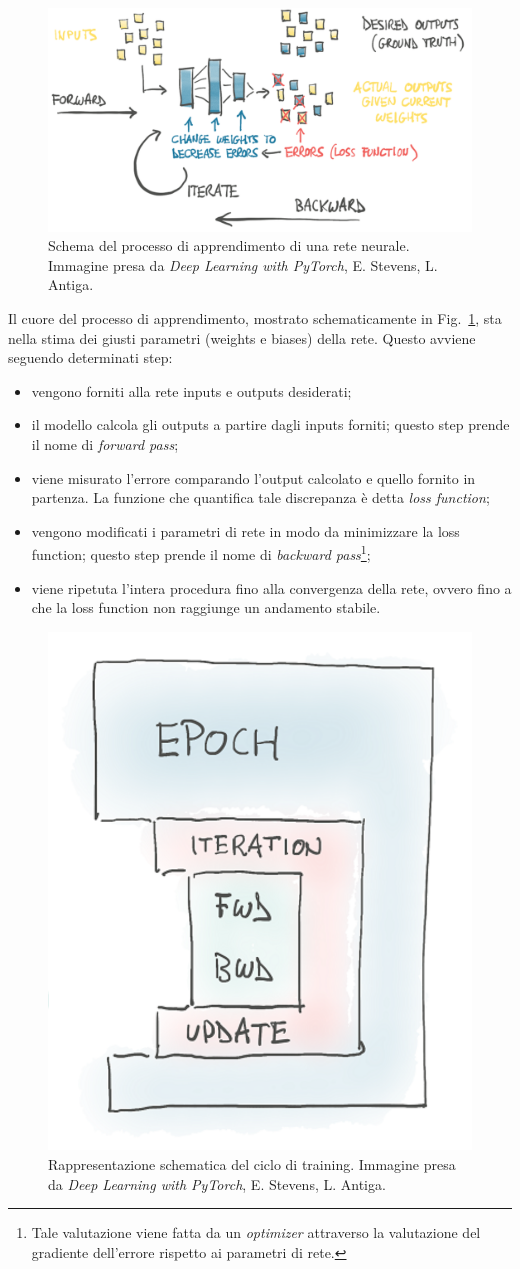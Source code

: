 \documentclass[12pt,a4paper,final]{book}
\begin{document}
\begin{figure}[!ht]
	\centering
	\includegraphics[width=0.7\linewidth]{../figures/learning_process.png}
	\caption{Schema del processo di apprendimento di una rete neurale. Immagine presa da \textit{Deep Learning with PyTorch}, E. Stevens, L. Antiga\cite{stevens}.}
	\label{apprendimento}
\end{figure}

Il cuore del processo di apprendimento, mostrato schematicamente in Fig.~\ref{apprendimento}, sta nella stima dei giusti parametri (weights e biases) della rete. Questo avviene seguendo determinati step:
\begin{itemize}
	\item vengono forniti alla rete inputs e outputs desiderati;
	\item il modello calcola gli outputs a partire dagli inputs forniti; questo step prende il nome di \textit{forward pass}; 
	\item viene misurato l'errore comparando l'output calcolato e quello fornito in partenza. La funzione che quantifica tale discrepanza è detta \textit{loss function};
	\item vengono modificati i parametri di rete in modo da minimizzare la loss function; questo step prende il nome di \textit{backward pass}\footnote{Tale valutazione viene fatta da un \textit{optimizer} attraverso la valutazione del gradiente dell'errore rispetto ai parametri di rete.};
	\item viene ripetuta l'intera procedura fino alla convergenza della rete, ovvero fino a che la loss function non raggiunge un andamento stabile.
\end{itemize}

\begin{figure}[!ht]
	\centering
	\includegraphics[width=0.4\linewidth]{../figures/ciclo_training.png}
	\caption{Rappresentazione schematica del ciclo di training. Immagine presa da \textit{Deep Learning with PyTorch}, E. Stevens, L. Antiga\cite{stevens}.}
	\label{ciclo_training}
\end{figure}
\end{document}

